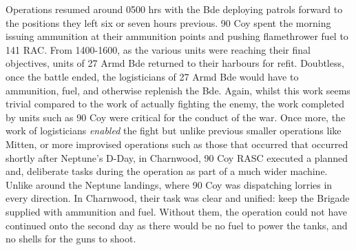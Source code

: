 \documentclass[noraggedright]{turabian-researchpaper}
\begin{document}
Operations resumed around 0500 hrs with the Bde deploying patrols forward to 
the positions they left six or seven hours previous.\autocite[9 July 1944]
{1318wd}  90 Coy spent the morning issuing ammunition at their ammunition 
points and pushing flamethrower fuel to 141 RAC.  From 1400-1600, as the 
various units were reaching their final objectives, units of 27 Armd Bde 
returned to their harbours for refit.  Doubtless, once the battle ended, the 
logisticians of 27 Armd Bde would have to ammunition, fuel, and otherwise 
replenish the Bde.\autocite[9 July 1944]{90wd}  Again, whilst this work seems 
trivial compared to the work of actually fighting the enemy, the work 
completed by units such as 90 Coy were critical for the conduct of the war.  
Once more, the work of logisticians \textit{enabled} the fight but unlike 
previous smaller operations like Mitten, or more improvised operations such 
as those that occurred that occurred shortly after Neptune's D-Day, in 
Charnwood, 90 Coy RASC executed a planned and, deliberate tasks during the 
operation as part of a much wider machine.  Unlike around the Neptune landings,
where 90 Coy was dispatching lorries in every direction. In Charnwood, their 
task was clear and unified:  keep the Brigade supplied with ammunition and 
fuel.  Without them, the operation could not have continued onto the second 
day as there would be no fuel to power the tanks, and no shells for the guns 
to shoot.
\end{document}
